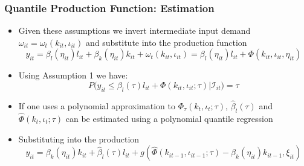 \documentclass{beamer}
\begin{document}
\begin{frame}
\frametitle{Quantile Production Function: Estimation}
\begin{itemize}
	\item Given these assumptions we invert intermediate input demand $\omega_{it}=\omega_{t}(k_{it}, \iota_{it})$ and substitute into the production function
	\begin{equation}
	y_{it}=\beta_{l}(\eta_{it})l_{it}+\beta_{k}(\eta_{it})k_{it}+\omega_{t}(k_{it}, \iota_{it})=\beta_{l}(\eta_{it})l_{it}+\Phi(k_{it}, \iota_{it}, \eta_{it})
	\end{equation}
	\item Using Assumption 1 we have:
	\begin{equation}
	P\big(y_{it}\leq \beta_{l}(\tau)l_{it}+\Phi(k_{it}, \iota_{it}; \tau)\big|\mathcal{I}_{it})=\tau
	\end{equation}
	\item If one uses a polynomial approximation to $\Phi_{\tau}(k_{t}, \iota_{t}; \tau)$, $\hat{\beta}_{l}(\tau)$ and $\hat{\Phi}(k_{t}, \iota_{t}; \tau)$ can be estimated using a polynomial quantile regression
	\item Substituting into the production
	\begin{equation}
	y_{it}=\beta_{k}(\eta_{it})k_{it}+\hat{\beta}_{l}(\tau)l_{it}+g(\hat{\Phi}(k_{it-1}, \iota_{it-1}; \tau)-\beta_{k}(\eta_{it})k_{it-1}, \xi_{it})
	\end{equation}
\end{itemize}
\end{frame}

\end{document}
